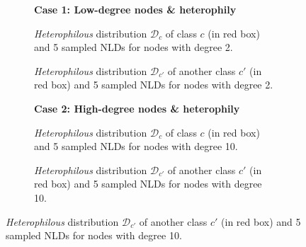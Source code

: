 \begin{figure}[tp]
    \centering
    \begin{subfigure}[b]{\textwidth}
       \caption*{\textbf{Case 1: Low-degree nodes \& heterophily}}
           \vspace{-0.6cm}
    \end{subfigure}
    \begin{subfigure}[b]{0.47\textwidth}
        \caption{\emph{Heterophilous} distribution $\mathcal{D}_c$ of class $c$ (in red box) and 5 sampled NLDs for nodes with degree 2.}
        \label{fig:revisit-degree-low-heterophily-1}
    \end{subfigure}
    \hspace{0.04\textwidth}
    \begin{subfigure}[b]{0.47\textwidth}
        \caption{\emph{Heterophilous} distribution $\mathcal{D}_{c'}$ of another class $c'$ (in red box) and 5 sampled NLDs for nodes with degree 2.}
        \label{fig:revisit-degree-low-heterophily-2}
    \end{subfigure}
    \begin{subfigure}[b]{\textwidth}
       \caption*{\textbf{Case 2: High-degree nodes \& heterophily}}
           \vspace{-0.6cm}
    \end{subfigure}
    \begin{subfigure}[b]{0.47\textwidth}
        \caption{\emph{Heterophilous} distribution $\mathcal{D}_c$ of class $c$ (in red box) and 5 sampled NLDs for nodes with degree 10.}
        \label{fig:revisit-degree-high-heterophily-1}
    \end{subfigure}
    \hspace{0.04\textwidth}
    \begin{subfigure}[b]{0.47\textwidth}
        \caption{\emph{Heterophilous} distribution $\mathcal{D}_{c'}$ of another class $c'$ (in red box) and 5 sampled NLDs for nodes with degree 10.}

\end{subfigure}
\end{figure}
